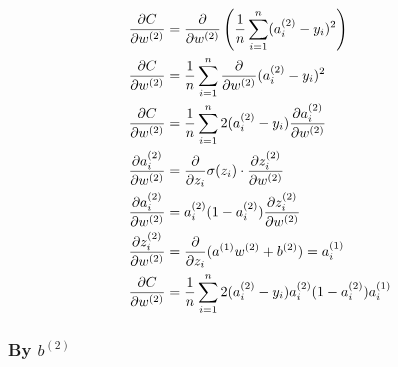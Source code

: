 \documentclass{article}
\begin{document}
\begin{align}
    \pd{C}{w^{(2)}} &= \pd{}{w^{(2)}}\left(\avgsum[i,n](a_i^{(2)} - y_i)^2\right) \\
    \pd{C}{w^{(2)}} &= \avgsum[i,n]\pd{}{w^{(2)}}(a_i^{(2)} - y_i)^2 \\
    \pd{C}{w^{(2)}} &= \avgsum[i,n]2(a_i^{(2)} - y_i)\pd{a_i^{(2)}}{w^{(2)}} \\
    \pd{a_i^{(2)}}{w^{(2)}} &= \pd{}{z_i} \sigma(z_i) \cdot \pd{z_i^{(2)}}{w^{(2)}} \\
    \pd{a_i^{(2)}}{w^{(2)}} &= a_i^{(2)}(1 - a_i^{(2)})\pd{z_i^{(2)}}{w^{(2)}} \\
    \pd{z_i^{(2)}}{w^{(2)}} &= \pd{}{z_i} (a^{(1)}w^{(2)}+b^{(2)}) = a_i^{(1)} \\
    \pd{C}{w^{(2)}} &= \avgsum[i,n]2(a_i^{(2)} - y_i)a_i^{(2)}(1 - a_i^{(2)}) a_i^{(1)} \\
\end{align}

\subsubsection{By $b^{(2)}$}
\end{document}
